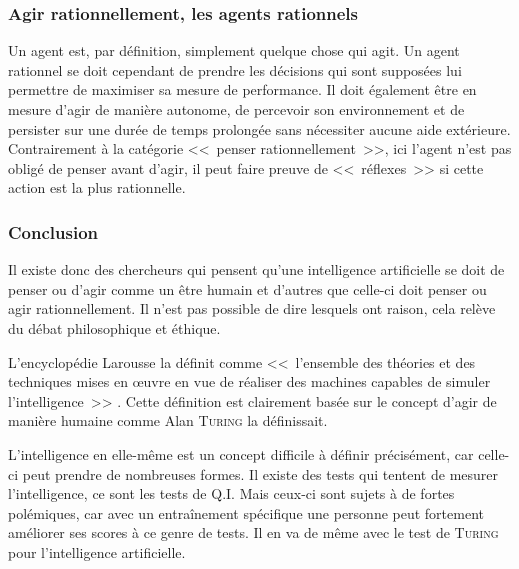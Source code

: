\subsubsection{Agir rationnellement, les agents rationnels}

Un agent est, par définition, simplement quelque chose qui agit.
Un agent rationnel se doit cependant de prendre les décisions qui sont supposées lui permettre de maximiser sa mesure de performance.
Il doit également être en mesure d'agir de manière autonome, de percevoir son environnement et de persister sur une durée de temps prolongée sans nécessiter aucune aide extérieure.
Contrairement à la catégorie <<~penser rationnellement~>>, ici l'agent n'est pas obligé de penser avant d'agir, il peut faire preuve de <<~réflexes~>> si cette action est la plus rationnelle.

\subsubsection{Conclusion}

Il existe donc des chercheurs qui pensent qu'une intelligence artificielle se doit de penser ou d'agir comme un être humain et d'autres que celle-ci doit penser ou agir rationnellement.
Il n'est pas possible de dire lesquels ont raison, cela relève du débat philosophique et éthique.

L'encyclopédie Larousse la définit comme <<~l'ensemble des théories et des techniques mises en œuvre en vue de réaliser des machines capables de simuler l'intelligence~>> \cite{def_larousse}.
Cette définition est clairement basée sur le concept d'agir de manière humaine comme Alan \textsc{Turing} la définissait.

L'intelligence en elle-même est un concept difficile à définir précisément, car celle-ci peut prendre de nombreuses formes.
Il existe des tests qui tentent de mesurer l'intelligence, ce sont les tests de Q.I.
Mais ceux-ci sont sujets à de fortes polémiques, car avec un entraînement spécifique une personne peut fortement améliorer ses scores à ce genre de tests.
Il en va de même avec le test de \textsc{Turing} pour l'intelligence artificielle.